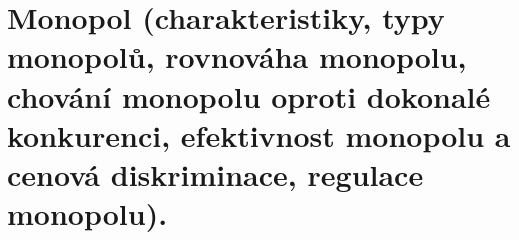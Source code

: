 \clearpage
\section{Monopol (charakteristiky, typy monopolů, rovnováha monopolu, chování monopolu
oproti dokonalé konkurenci, efektivnost monopolu a cenová diskriminace, regulace
monopolu).}